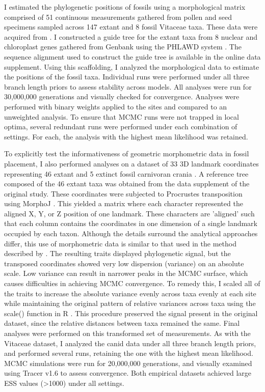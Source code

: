 \documentclass[12pt]{article}
\begin{document}
I estimated the phylogenetic positions of fossils using a morphological
matrix comprised of 51 continuous measurements gathered from pollen and
seed specimens sampled across 147 extant and 8 fossil Vitaceae taxa.
These data were acquired from \cite{chen2009history}. I constructed a guide tree
for the extant taxa from 8 nuclear and chloroplast genes gathered from
Genbank using the PHLAWD system \citep{soltis2011angiosperm}.
The sequence alignment used to construct the guide tree is available in
the online data supplement.
 Using this scaffolding, I analyzed the morphological data to estimate the positions of the fossil taxa.
Individual runs were performed under all three branch length priors to
assess stability across models. All analyses were run for 30,000,000
generations and visually checked for convergence. Analyses were
performed with binary weights applied to the sites and compared to an
unweighted analysis. To ensure that MCMC runs were not trapped in local
optima, several redundant runs were performed under each combination of settings.
For each, the analysis with the highest mean likelihood was retained.

To explicitly test the informativeness of geometric morphometric data in
fossil placement, I also performed analyses on a dataset of 33 3D landmark
coordinates representing 46 extant and 5 extinct fossil carnivoran
crania \citep{jones2015impact}. A reference tree composed of the 46 extant
taxa was obtained from the data supplement of the original study. These
coordinates were subjected to Procrustes transposition using MorphoJ \citep{klingenberg2011morphoj}.
This yielded a matrix where each character represented the aligned  X, Y, or Z position of one landmark. These
characters are 'aligned' such that each column contains the coordinates in one dimension of a single landmark
occupied by each taxon.  Although the details surround the analytical approaches differ, 
this use of morphometric data is similar to that used in the method described by
\cite{catalano2010phylogenetic}.
The resulting traits displayed phylogenetic signal, but the transposed
coordinates showed very low dispersion (variance) on an absolute scale.
Low variance can result in narrower peaks in the MCMC surface, which causes difficulties in
achieving MCMC convergence. To remedy this, I scaled all of the traits
to increase the absolute variance evenly across taxa evenly at each site while
maintaining the original pattern of relative variances across taxa using the scale() function in R \citep{R}. This
procedure preserved the signal present in the original dataset, since the
relative distances between taxa remained the same. Final analyses were
performed on this transformed set of measurements. As with the
Vitaceae dataset, I analyzed the canid data under all three branch
length priors, and performed several runs, retaining the one with the 
highest mean likelihood.
 MCMC simulations were run for 20,000,000 generations, and
visually examined using Tracer v1.6 to assess convergence. Both
empirical datasets achieved large ESS values (>1000) under all settings. 
\end{document}
